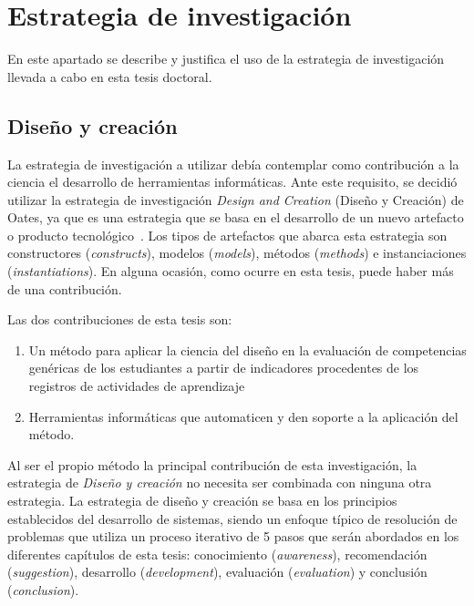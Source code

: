 
\section{Estrategia de investigación}
\label{sec:EstrategiaInvestigacion}

En este apartado se describe y justifica el uso de la estrategia de investigación llevada a cabo en esta tesis doctoral.  %

\subsection{Diseño y creación} %

La estrategia de investigación a utilizar debía contemplar como contribución a la ciencia el desarrollo de herramientas informáticas. Ante este requisito, se decidió utilizar la estrategia de investigación \emph{Design and Creation} (Diseño y Creación) de Oates, ya que es una estrategia que se basa en el desarrollo de un nuevo artefacto o producto tecnológico~\cite{oates2006researching}. Los tipos de artefactos que abarca esta estrategia son constructores (\emph{constructs}), modelos (\emph{models}), métodos (\emph{methods}) e instanciaciones (\emph{instantiations}). En alguna ocasión, como ocurre en esta tesis, puede haber más de una contribución.

Las dos contribuciones de esta tesis son:
\begin{enumerate}
\item Un método para aplicar la ciencia del diseño en la evaluación de competencias genéricas de los estudiantes a partir de indicadores procedentes de los registros de actividades de aprendizaje
\item Herramientas informáticas que automaticen y den soporte a la aplicación del método.
\end{enumerate} 

Al ser el propio método la principal contribución de esta investigación, la estrategia de \emph{Diseño y creación} no necesita ser combinada con ninguna otra estrategia. La estrategia de diseño y creación se basa en los principios establecidos del desarrollo de sistemas, siendo un enfoque típico de resolución de problemas que utiliza un proceso iterativo de 5 pasos que serán abordados en los diferentes capítulos de esta tesis: conocimiento (\emph{awareness}), recomendación (\emph{suggestion}), desarrollo (\emph{development}), evaluación (\emph{evaluation}) y conclusión (\emph{conclusion}).

